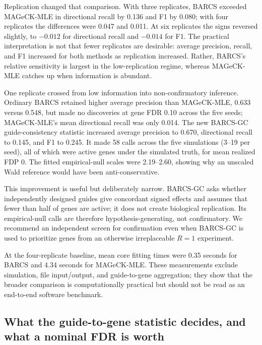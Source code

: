 Replication changed that comparison.  With three replicates, BARCS exceeded
MAGeCK-MLE in directional recall by 0.136 and F1 by 0.080; with four
replicates the differences were 0.047 and 0.011.  At six replicates the signs
reversed slightly, to $-0.012$ for directional recall and $-0.014$ for F1.
The practical interpretation is not that fewer replicates are desirable:
average precision, recall, and F1 increased for both methods as replication
increased.  Rather, BARCS's relative sensitivity is largest in the
low-replication regime, whereas MAGeCK-MLE catches up when information is
abundant.

One replicate crossed from low information into non-confirmatory inference.
Ordinary BARCS retained higher average precision than MAGeCK-MLE, 0.633 versus
0.548, but made no discoveries at gene FDR 0.10 across the five seeds;
MAGeCK-MLE's mean directional recall was only 0.014.  The new BARCS-GC
guide-consistency statistic increased average precision to 0.670,
directional recall to 0.145, and F1 to 0.245.  It made 58 calls across the
five simulations (3--19 per seed), all of which were active genes under the
simulated truth, for mean realized FDP 0.  The fitted empirical-null scales
were 2.19--2.60, showing why an unscaled Wald reference would have been
anti-conservative.

This improvement is useful but deliberately narrow.  BARCS-GC asks whether
independently designed guides give concordant signed effects and assumes that
fewer than half of genes are active; it does not create biological replication.
Its empirical-null calls are therefore hypothesis-generating, not
confirmatory.  We recommend an independent screen for confirmation even when
BARCS-GC is used to prioritize genes from an otherwise irreplaceable $R=1$
experiment.


\noindent\begin{minipage}{\textwidth}
At the four-replicate baseline, mean core fitting times were 0.35 seconds for
BARCS and 4.34 seconds for MAGeCK-MLE.  These measurements exclude
simulation, file input/output, and guide-to-gene aggregation; they show that
the broader comparison is computationally practical but should not be read as
an end-to-end software benchmark.
\end{minipage}

\clearpage
\subsection{What the guide-to-gene statistic decides, and what a nominal FDR
is worth}
\label{sec:genestat}

